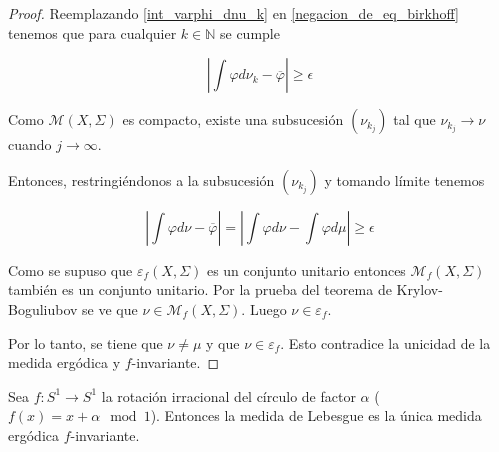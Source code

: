 \begin{proof}
	Reemplazando \eqref{int_varphi_dnu_k} en \eqref{negacion_de_eq_birkhoff} tenemos que para cualquier $k \in \mathbb{N}$ se cumple
	
	\begin{equation}
		\left| \int \varphi d\nu_k - \overline{\varphi} \right| \geq \epsilon
	\end{equation}
	
	Como $\mathcal{M}(X,\Sigma)$ es compacto, existe una subsucesión $(\nu_{k_j})$ tal que $\nu_{k_j} \rightarrow \nu$ cuando $j \rightarrow \infty$.
	
	Entonces, restringiéndonos a la subsucesión $(\nu_{k_j})$ y tomando límite tenemos
	
	\begin{equation}
		\left| \int \varphi d\nu - \overline{\varphi} \right| = \left| \int \varphi d\nu - \int \varphi d\mu \right| \geq \epsilon
	\end{equation}
	
	Como se supuso que $\varepsilon_f(X,\Sigma)$ es un conjunto unitario entonces $\mathcal{M}_f(X,\Sigma)$ también es un conjunto unitario. Por la prueba del teorema de Krylov-Boguliubov se ve que $\nu \in \mathcal{M}_f(X,\Sigma)$. Luego $\nu \in \varepsilon_f$. 
	
	Por lo tanto, se tiene que $\nu \neq \mu$  y que $\nu \in \varepsilon_f$. Esto contradice la unicidad de la medida ergódica y $f$-invariante.
\end{proof}



\begin{teorema}\label{main1}
  Sea $ f: S^1 \rightarrow S^1 $ la rotación irracional del círculo de factor $ \alpha $ ($ f(x) = x+\alpha \mod 1 $). Entonces la medida de Lebesgue es la única medida ergódica $f$-invariante.
\end{teorema}

